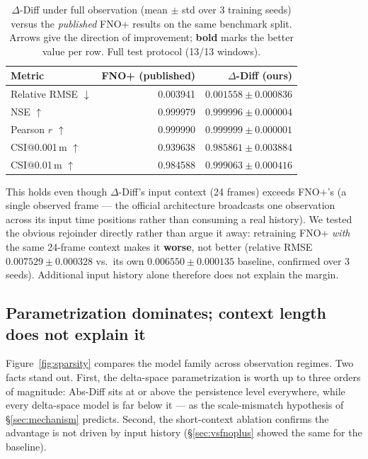\documentclass[11pt]{article}
\newcommand{\ours}{\mbox{$\Delta$-Diff}}       %
\newcommand{\absdiff}{\mbox{Abs-Diff}}          %
\begin{document}
\begin{table}[t]
\centering
\caption{\ours{} under full observation (mean $\pm$ std over 3 training
seeds) versus the \emph{published} FNO+ results on the same benchmark
split. Arrows give the direction of improvement; \textbf{bold} marks the
better value per row. Full test protocol (13/13 windows).}
\label{tab:vsfnoplus}
\begin{tabular}{lrr}
\toprule
Metric & FNO+ (published) & \ours{} (ours) \\
\midrule
Relative RMSE $\downarrow$ & 0.003941 & $\mathbf{0.001558 \pm 0.000836}$ \\
NSE $\uparrow$              & 0.999979 & $\mathbf{0.999996 \pm 0.000004}$ \\
Pearson $r$ $\uparrow$      & 0.999990 & $\mathbf{0.999999 \pm 0.000001}$ \\
CSI@0.001\,m $\uparrow$     & 0.939638 & $\mathbf{0.985861 \pm 0.003884}$ \\
CSI@0.01\,m $\uparrow$      & 0.984588 & $\mathbf{0.999063 \pm 0.000416}$ \\
\bottomrule
\end{tabular}
\end{table}

This holds even though \ours{}'s input context (24 frames) exceeds FNO+'s
(a single observed frame --- the official architecture broadcasts one
observation across its input time positions rather than consuming a real
history). We tested the obvious rejoinder directly rather than argue it
away: retraining FNO+ \emph{with} the same 24-frame context makes it
\textbf{worse}, not better (relative RMSE $0.007529\pm0.000328$ vs.\ its
own $0.006550\pm0.000135$ baseline, confirmed over 3 seeds). Additional
input history alone therefore does not explain the margin.

\subsection{Parametrization dominates; context length does not explain it}
\label{sec:paramresults}
Figure~\ref{fig:sparsity} compares the model family across observation
regimes. Two facts stand out. First, the delta-space parametrization is
worth up to three orders of magnitude: \absdiff{} sits at or above the
persistence level everywhere, while every delta-space model is far below
it --- as the scale-mismatch hypothesis of \S\ref{sec:mechanism} predicts.
Second, the short-context ablation confirms the advantage is not driven by
input history (\S\ref{sec:vsfnoplus} showed the same for the baseline).
\end{document}
